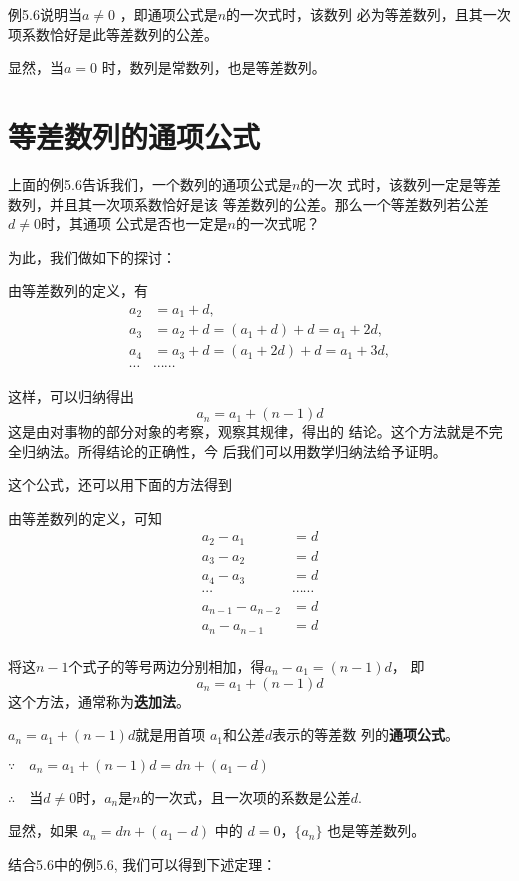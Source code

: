 例5.6说明当$a\ne 0$
，即通项公式是$n$的一次式时，该数列
必为等差数列，且其一次项系数恰好是此等差数列的公差。

显然，当$a=0$
时，数列是常数列，也是等差数列。

\section{等差数列的通项公式}
上面的例5.6告诉我们，一个数列的通项公式是$n$的一次
式时，该数列一定是等差数列，并且其一次项系数恰好是该
等差数列的公差。那么一个等差数列若公差$d\ne 0$时，其通项
公式是否也一定是$n$的一次式呢？

为此，我们做如下的探讨：

由等差数列的定义，有
\[\begin{split}
  a_2&=a_1+d,\\
a_3&=a_2+d=(a_1+d)+d=a_1+2d,\\
a_4&=a_3+d=(a_1+2d)+d=a_1+3d,\\
\cdots &\cdots \cdots
\end{split}\]

这样，可以归纳得出
\[a_n=a_1+(n-1)d\]
这是由对事物的部分对象的考察，观察其规律，得出的
结论。这个方法就是不完全归纳法。所得结论的正确性，今
后我们可以用数学归纳法给予证明。

这个公式，还可以用下面的方法得到

由等差数列的定义，可知
\[\begin{split}
    a_2-a_1&=d\\
    a_3-a_2&=d\\
    a_4-a_3&=d\\
    \cdots&\cdots\cdots\\
    a_{n-1}-a_{n-2}&=d\\
    a_n-a_{n-1}&=d\\
\end{split}\]

将这$n-1$个式子的等号两边分别相加，得$a_n-a_1=(n-1)d$，
即
\[a_n=a_1+(n-1)d\]
这个方法，通常称为\textbf{迭加法}。

$a_n=a_1+(n-1)d$就是用首项
$a_1$和公差$d$表示的等差数
列的\textbf{通项公式}。

$\because\quad a_n=a_1+(n-1)d=dn+(a_1-d)$

$\therefore\quad$当$d\ne 0$时，$a_n$是$n$的一次式，且一次项的系数是公差$d$.

显然，如果
$a_n=dn+(a_1-d)$
中的
$d=0$，$\{a_n\}$
也是等差数列。

结合5.6中的例5.6, 我们可以得到下述定理：

